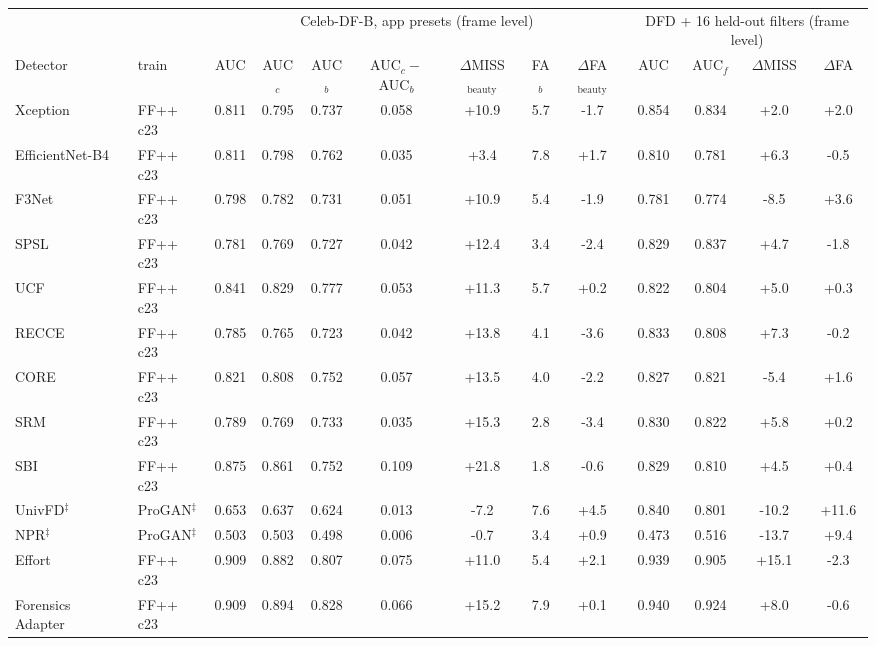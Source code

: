 \begin{tabular}{@{}ll ccccccc cccc@{}}
\toprule
 & & \multicolumn{7}{c}{Celeb-DF-B, app presets (frame level)} & \multicolumn{4}{c}{DFD + 16 held-out filters (frame level)} \\
\cmidrule(lr){3-9}\cmidrule(lr){10-13}
Detector & train & AUC & AUC$_c$ & AUC$_b$ & AUC$_c{-}$AUC$_b$ & $\Delta$MISS$_\text{beauty}$ & FA$_b$ & $\Delta$FA$_\text{beauty}$ & AUC & AUC$_f$ & $\Delta$MISS & $\Delta$FA \\
\midrule
Xception~\cite{xception} & FF++ c23 & 0.811 & 0.795 & 0.737 & 0.058 & +10.9 & 5.7 & -1.7 & 0.854 & 0.834 & +2.0 & +2.0 \\
EfficientNet-B4~\cite{efficientnet} & FF++ c23 & 0.811 & 0.798 & 0.762 & 0.035 & +3.4 & 7.8 & +1.7 & 0.810 & 0.781 & +6.3 & -0.5 \\
F3Net~\cite{f3net} & FF++ c23 & 0.798 & 0.782 & 0.731 & 0.051 & +10.9 & 5.4 & -1.9 & 0.781 & 0.774 & -8.5 & +3.6 \\
SPSL~\cite{spsl} & FF++ c23 & 0.781 & 0.769 & 0.727 & 0.042 & +12.4 & 3.4 & -2.4 & 0.829 & 0.837 & +4.7 & -1.8 \\
UCF~\cite{ucf} & FF++ c23 & 0.841 & 0.829 & 0.777 & 0.053 & +11.3 & 5.7 & +0.2 & 0.822 & 0.804 & +5.0 & +0.3 \\
RECCE~\cite{recce} & FF++ c23 & 0.785 & 0.765 & 0.723 & 0.042 & +13.8 & 4.1 & -3.6 & 0.833 & 0.808 & +7.3 & -0.2 \\
CORE~\cite{core} & FF++ c23 & 0.821 & 0.808 & 0.752 & 0.057 & +13.5 & 4.0 & -2.2 & 0.827 & 0.821 & -5.4 & +1.6 \\
SRM~\cite{srm} & FF++ c23 & 0.789 & 0.769 & 0.733 & 0.035 & +15.3 & 2.8 & -3.4 & 0.830 & 0.822 & +5.8 & +0.2 \\
SBI~\cite{sbi} & FF++ c23 & 0.875 & 0.861 & 0.752 & 0.109 & +21.8 & 1.8 & -0.6 & 0.829 & 0.810 & +4.5 & +0.4 \\
UnivFD$^\ddagger$~\cite{univfd} & ProGAN$^\ddagger$ & 0.653 & 0.637 & 0.624 & 0.013 & -7.2 & 7.6 & +4.5 & 0.840 & 0.801 & -10.2 & +11.6 \\
NPR$^\ddagger$~\cite{npr} & ProGAN$^\ddagger$ & 0.503 & 0.503 & 0.498 & 0.006 & -0.7 & 3.4 & +0.9 & 0.473 & 0.516 & -13.7 & +9.4 \\
Effort~\cite{effort} & FF++ c23 & 0.909 & 0.882 & 0.807 & 0.075 & +11.0 & 5.4 & +2.1 & 0.939 & 0.905 & +15.1 & -2.3 \\
Forensics Adapter~\cite{forensicsadapter} & FF++ c23 & 0.909 & 0.894 & 0.828 & 0.066 & +15.2 & 7.9 & +0.1 & 0.940 & 0.924 & +8.0 & -0.6 \\

\end{tabular}
